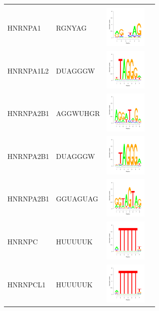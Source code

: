 \documentclass[a4paper,10pt]{article}
\begin{document}
\begin{center}
\begin{longtable}{|l|l|l|p{6cm}|}
 & \\
 \cline{1-3}
HNRNPA1 & RGNYAG & \includegraphics[height=0.8in]{./seqLogo/HNRNPA1_rgnyag.pdf}
 &  \\
 \cline{1-3}
 HNRNPA1L2 & DUAGGGW &  \includegraphics[height=0.8in]{./seqLogo/HNRNPA1L2_duagggw.pdf}
&  \\
\cline{1-3}
HNRNPA2B1 & AGGWUHGR &  \includegraphics[height=0.8in]{./seqLogo/HNRNPA2B1_aggwuhgr.pdf}
 &  \\
 \cline{1-3}
HNRNPA2B1 & DUAGGGW &  \includegraphics[height=0.8in]{./seqLogo/HNRNPA2B1_duagggw.pdf}
 & \\
 \cline{1-3}
HNRNPA2B1 & GGUAGUAG &  \includegraphics[height=0.8in]{./seqLogo/HNRNPA2B1_gguaguag.pdf}
 &  \\
 \cline{1-3}
HNRNPC &  HUUUUUK & \includegraphics[height=0.8in]{./seqLogo/HNRNPC_huuuuuk.pdf}
 &  \\
 \cline{1-3}
HNRNPCL1 & HUUUUUK & \includegraphics[height=0.8in]{./seqLogo/HNRNPCL1_huuuuuk.pdf}

\end{longtable}
\end{center}
\end{document}
